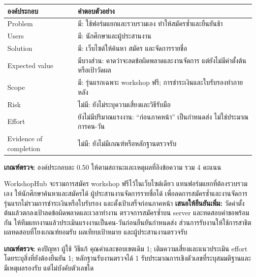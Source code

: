 \begin{tabularx}{\linewidth}{|p{3.6cm}|Y|}\hline
องค์ประกอบ & คำตอบตัวอย่าง\\\hline
Problem & มี: ใช้ฟอร์มแยกและรวบรวมเอง ทำให้สมัครซ้ำและยืนยันช้า\\\hline
Users & มี: นักศึกษาและผู้ประสานงาน\\\hline
Solution & มี: เว็บไซต์ให้ค้นหา สมัคร และจัดการรายชื่อ\\\hline
Expected value & มีบางส่วน: คาดว่าจะลดข้อผิดพลาดและงานจัดการ แต่ยังไม่มีค่าตั้งต้นหรือเป้าวัดผล\\\hline
Scope & มี: รุ่นแรกเฉพาะ workshop ฟรี; การชำระเงินและใบรับรองทำภายหลัง\\\hline
Risk & ไม่มี: ยังไม่ระบุความเสี่ยงและวิธีรับมือ\\\hline
Effort & ยังไม่มีปริมาณแรงงาน: “ก่อนภาคหน้า” เป็นกำหนดส่ง ไม่ใช่ประมาณการคน-วัน\\\hline
Evidence of completion & ไม่มี: ยังไม่มีเกณฑ์หรือหลักฐานตรวจรับ\\\hline
\end{tabularx}
\textbf{เกณฑ์ตรวจ:} องค์ประกอบละ 0.50 ให้ตามสถานะและเหตุผลที่อิงข้อความ รวม 4 คะแนน

WorkshopHub จะรวมการสมัคร workshop ฟรีไว้ในเว็บไซต์เดียว แทนฟอร์มแยกที่ต้องรวบรวมเอง ให้นักศึกษาค้นหาและสมัครได้ ผู้ประสานงานจัดการรายชื่อได้ เพื่อลดการสมัครซ้ำและงานจัดการ รุ่นแรกไม่รวมการชำระเงินหรือใบรับรอง และตั้งเป้าเสร็จก่อนภาคหน้า \textbf{เสนอให้ยืนยันเพิ่ม:} วัดค่าตั้งต้นแล้วตกลงเป้าลดข้อผิดพลาดและเวลาทำงาน ตรวจการสมัครซ้ำบน server และทดสอบคำขอพร้อมกัน ให้ทีมแยกงานแล้วประเมินแรงงานเป็นคน-วันก่อนยืนยันกำหนดส่ง ส่วนการรับงานให้ใช้การสาธิต ผลทดสอบที่โยงเกณฑ์ยอมรับ ผลเทียบเป้าหมาย และผู้ประสานงานตรวจรับ\par
{}
\textbf{เกณฑ์ตรวจ:} คงปัญหา ผู้ใช้ วิธีแก้ คุณค่าและขอบเขตเดิม 1; เติมความเสี่ยงและแนวประเมิน effort โดยระบุสิ่งที่ยังต้องยืนยัน 1; หลักฐานรับงานตรวจได้ 1 รับประมาณการเชิงตัวเลขที่ระบุสมมติฐานและมีเหตุผลรองรับ แต่ไม่บังคับตัวเลขใด
\newpage


